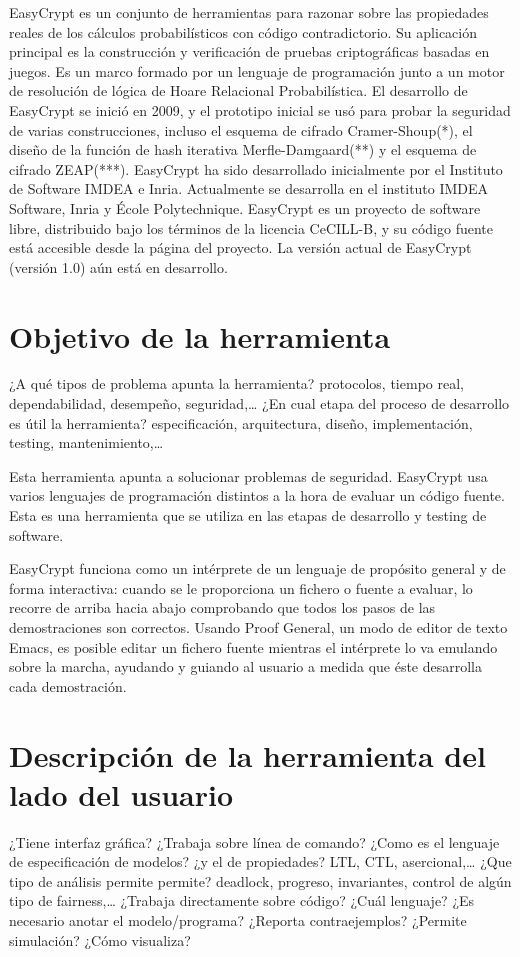 \documentclass[runningheads,a4paper]{llncs}
\begin{document}
EasyCrypt es un conjunto de herramientas para razonar sobre las propiedades reales de los cálculos probabilísticos con código contradictorio. Su aplicación principal es la construcción y verificación de pruebas criptográficas basadas en juegos. 
Es un marco formado por un lenguaje de programación junto a un motor de resolución de lógica de Hoare Relacional Probabilística. El desarrollo de EasyCrypt se inició en 2009, y el prototipo inicial se usó para probar la seguridad de varias construcciones, incluso el esquema de cifrado Cramer-Shoup(*), el diseño de la función de hash iterativa Merfle-Damgaard(**) y el esquema de cifrado ZEAP(***). EasyCrypt ha sido desarrollado inicialmente por el Instituto de Software IMDEA e Inria. Actualmente se desarrolla en el instituto IMDEA Software, Inria y École Polytechnique. EasyCrypt es un proyecto de software libre, distribuido bajo los términos de la licencia CeCILL-B, y su código fuente está accesible desde la página del proyecto. 
La versión actual de EasyCrypt (versión 1.0) aún está en desarrollo. 

\section{Objetivo de la herramienta} 
¿A qué tipos de problema apunta la herramienta? protocolos, tiempo real, dependabilidad, desempeño, seguridad,… 
¿En cual etapa del proceso de desarrollo es útil la herramienta? especificación, arquitectura, diseño, implementación, testing, mantenimiento,…

Esta herramienta apunta a solucionar problemas de seguridad. EasyCrypt usa varios lenguajes de programación distintos a la hora de evaluar un código fuente. Esta es una herramienta que se utiliza en las etapas de desarrollo y testing de software. 

EasyCrypt funciona como un intérprete de un lenguaje de propósito general y de forma interactiva: cuando se le proporciona un fichero o fuente a evaluar, lo recorre de arriba hacia abajo comprobando que todos los pasos de las demostraciones son correctos. Usando Proof General, un modo de editor de texto Emacs, es posible editar un fichero fuente mientras el intérprete lo va emulando sobre la marcha, ayudando y guiando al usuario a medida que éste desarrolla cada demostración. 

\section{Descripción de la herramienta del lado del usuario}
¿Tiene interfaz gráfica? 
¿Trabaja sobre línea de comando? 
¿Como es el lenguaje de especificación de modelos? 
¿y el de propiedades? LTL, CTL, asercional,… 
¿Que tipo de análisis permite permite? deadlock, progreso, invariantes, control de algún tipo de fairness,… 
¿Trabaja directamente sobre código? ¿Cuál lenguaje? 
¿Es necesario anotar el modelo/programa?
¿Reporta contraejemplos? 
¿Permite simulación? 
¿Cómo visualiza?
\end{document}

